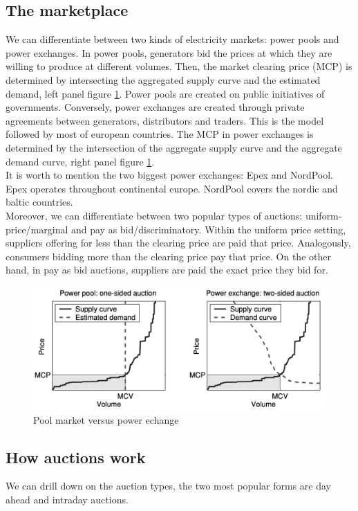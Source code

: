 \subsection{The marketplace}
We can differentiate between two kinds of electricity markets: power pools and power exchanges. In power pools, generators bid the prices at which they are willing to produce at different volumes. Then, the market clearing price (MCP) is determined by intersecting the aggregated supply curve and the estimated demand, left panel figure \ref{fig:pool_vs_echange}. Power pools are created on public initiatives of governments. Conversely, power exchanges are created through private agreements between generators, distributors and traders. This is the model followed by most of european countries.
The MCP in power exchanges is determined by the intersection of the aggregate supply curve and the aggregate demand curve, right panel figure \ref{fig:pool_vs_echange}.
\\
It is worth to mention the two biggest power exchanges: Epex and NordPool. Epex operates throughout continental europe. NordPool covers the nordic and baltic countries.
\\
Moreover, we can differentiate between two popular types of auctions: uniform-price/marginal and pay as bid/discriminatory. Within the uniform price setting, suppliers offering for less than the clearing price are paid that price. Analogously, consumers bidding more than the clearing price pay that price. On the other hand, in pay as bid auctions, suppliers are paid the exact price they bid for.


\begin{figure}[!h]
    \includegraphics[width=\textwidth]{images/pool_vs_echange.png}
    \caption{Pool market versus power echange \cite{weron2006modeling}}
    \label{fig:pool_vs_echange}
\end{figure}

\subsection{How auctions work}
We can drill down on the auction types, the two most popular forms are day ahead and intraday auctions.

